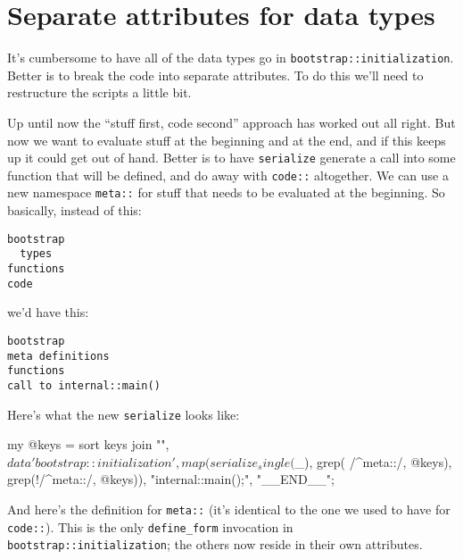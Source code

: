 \documentclass{report}
\begin{document}
\section{Separate attributes for data types}\label{sec:some-improvements-separate-attributes-for-data-types}
    It's cumbersome to have all of the data types go in {\tt bootstrap::initialization}. Better is to break the code into separate attributes. To do this we'll need to restructure the scripts
    a little bit.

    Up until now the ``stuff first, code second'' approach has worked out all right. But now we want to evaluate stuff at the beginning and at the end, and if this keeps up it could get out of
    hand. Better is to have {\tt serialize} generate a call into some function that will be defined, and do away with {\tt code::} altogether. We can use a new namespace {\tt meta::} for stuff
    that needs to be evaluated at the beginning. So basically, instead of this:

\begin{verbatim}
bootstrap
  types
functions
code
\end{verbatim}

    \noindent we'd have this:

\begin{verbatim}
bootstrap
meta definitions
functions
call to internal::main()
\end{verbatim}

    Here's what the new {\tt serialize} looks like:

\begin{perlcode}
my @keys = sort keys %
join "\n", $data{'bootstrap::initialization'},
           map(serialize_single($_),
             grep( /^meta::/, @keys),
             grep(!/^meta::/, @keys)),
           "internal::main();",
           "__END__"; \end{perlcode}

    And here's the definition for {\tt meta::} (it's identical to the one we used to have for {\tt code::}). This is the only \verb|define_form| invocation in {\tt bootstrap::initialization};
    the others now reside in their own attributes.

\end{document}
